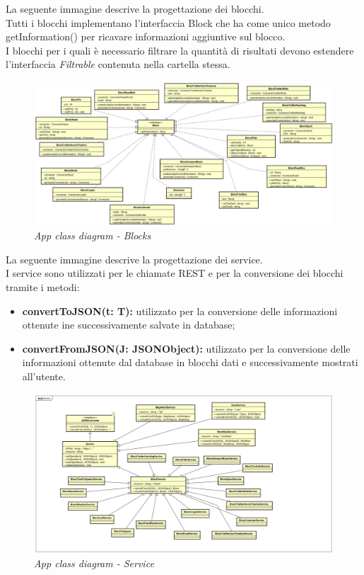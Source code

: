 \newpage
La seguente immagine descrive la progettazione dei blocchi. \\
Tutti i blocchi implementano l'interfaccia Block che ha come unico metodo getInformation() per ricavare informazioni aggiuntive sul blocco. \\
I blocchi per i quali è necessario filtrare la quantità di risultati devono estendere l'interfaccia \textit{Filtrable} contenuta nella cartella stessa.
\begin{figure} [H]
	\centering
	\includegraphics[scale=0.3]{./images/Blocks.png}
	\caption{\textit{App class diagram - Blocks}}\label{Blocks}
\end{figure}
\newpage
La seguente immagine descrive la progettazione dei service. \\
I service sono utilizzati per le chiamate REST e per la conversione dei blocchi tramite i metodi:
\begin{itemize}
	\item \textbf{convertToJSON(t: T):} utilizzato per la conversione delle informazioni ottenute ine successivamente salvate in database;
	\item \textbf{convertFromJSON(J: JSONObject):} utilizzato per la conversione delle informazioni ottenute dal database in blocchi dati e successivamente mostrati all'utente. 
\end{itemize}
\begin{figure} [H]
	\centering
	\includegraphics[scale=0.3]{./images/Service.png}
	\caption{\textit{App class diagram - Service}}\label{Service}
\end{figure}
